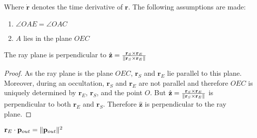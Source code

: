         \vspace{6pt}
        Where $\dot{\mathbf{r}}$ denotes the time derivative
        of $\mathbf{r}$. The following assumptions are made:
        \begin{enumerate}
            \item $\angle{OAE}=\angle{OAC}$
            \item $A$ lies in the plane $OEC$
        \end{enumerate}
        \begin{theorem}
            \label{theorem:ray_plane_perp_to_r_e_cross_r_s}
            The ray plane is perpendicular to
            $\hat{\mathbf{z}}%
             =\frac{\mathbf{r}_{S}\times
             \mathbf{r}_{E}}{\norm{\mathbf{r}_{S}\times
             \mathbf{r}_{E}}}$
        \end{theorem}
        \begin{proof}
            As the ray plane is the plane $OEC$,
            $\mathbf{r}_{S}$ and $\mathbf{r}_{E}$ lie parallel
            to this plane. Moreover, during an occultation,
            $\mathbf{r}_{S}$ and $\mathbf{r}_{E}$ are not
            parallel and therefore $OEC$ is uniquely determined
            by $\mathbf{r}_{E}$, $\mathbf{r}_{S}$, and the point
            $O$. But
            $\hat{\mathbf{z}}%
             =\frac{\mathbf{r}_{S}\times
             \mathbf{r}_{E}}{\norm{\mathbf{r}_{S}\times
             \mathbf{r}_{E}}}$
            is perpendicular to both $\mathbf{r}_{E}$ and
            $\mathbf{r}_{S}$. Therefore $\hat{\mathbf{z}}$ is
            perpendicular to the ray plane.
        \end{proof}
        \begin{theorem}
            \label{theorem:r_e_dot_p_out_equal_p_out_square}
            $\mathbf{r}_{E}\cdot\mathbf{p}_{out}%
             =\norm{\mathbf{p}_{out}}^{2}$
        \end{theorem}

